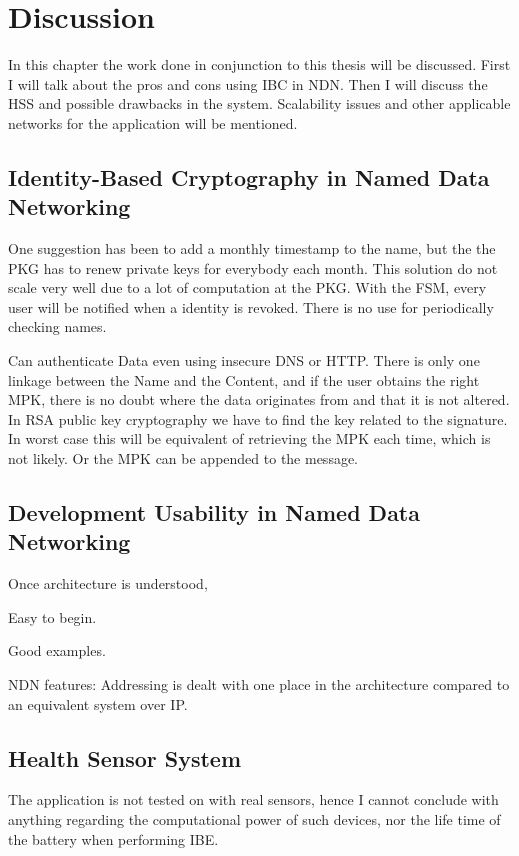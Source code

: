 \chapter{Discussion}
In this chapter the work done in conjunction to this thesis will be discussed. 
First I will talk about the pros and cons using \gls{IBC} in \gls{NDN}.
Then I will discuss the \gls{HSS} and possible drawbacks in the system. 
Scalability issues and other applicable networks for the application will be mentioned.

\section{Identity-Based Cryptography in Named Data Networking}
One suggestion has been to add a monthly timestamp to the name, but the the \gls{PKG} has to renew private keys for everybody each month. 
This solution do not scale very well due to a lot of computation at the \gls{PKG}.
With the \gls{FSM}, every user will be notified when a identity is revoked.
There is no use for periodically checking names.

Can authenticate Data even using insecure DNS or HTTP. 
There is only one linkage between the Name and the Content, and if the user obtains the right \gls{MPK}, there is no doubt where the data originates from and that it is not altered.
In RSA public key cryptography we have to find the key related to the signature. 
In worst case this will be equivalent of retrieving the \gls{MPK} each time, which is not likely. 
Or the \gls{MPK} can be appended to the message.

\section{Development Usability in Named Data Networking}
Once architecture is understood, 

Easy to begin. 

Good examples.

\gls{NDN} features: Addressing is dealt with one place in the architecture compared to an equivalent system over \gls{IP}. 

\section{Health Sensor System}
The application is not tested on with real sensors, hence I cannot conclude with anything regarding the computational power of such devices, nor the life time of the battery when performing \gls{IBE}.  

